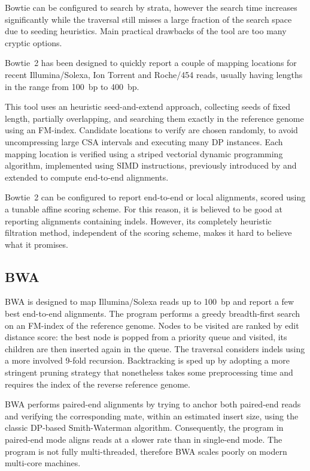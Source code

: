 Bowtie can be configured to search by strata, however the search time increases significantly while the traversal still misses a large fraction of the search space due to seeding heuristics.
Main practical drawbacks of the tool are too many cryptic options.

Bowtie~2 \citep{Langmead2012} has been designed to quickly report a couple of mapping locations for recent Illumina/Solexa, Ion Torrent and Roche/454 reads, usually having lengths in the range from 100~bp to 400~bp.

This tool uses an heuristic seed-and-extend approach, collecting seeds of fixed length, partially overlapping, and searching them exactly in the reference genome using an FM-index.
Candidate locations to verify are chosen randomly, to avoid uncompressing large CSA intervals and executing many DP instances.
Each mapping location is verified using a striped vectorial dynamic programming algorithm, implemented using SIMD instructions, previously introduced by \citep{Farrar2007} and extended to compute end-to-end alignments.

Bowtie~2 can be configured to report end-to-end or local alignments, scored using a tunable affine scoring scheme.
For this reason, it is believed to be good at reporting alignments containing indels.
However, its completely heuristic filtration method, independent of the scoring scheme, makes it hard to believe what it promises.


\subsection{BWA}

BWA \citep{Li2009} is designed to map Illumina/Solexa reads up to 100~bp and report a few best end-to-end alignments.
The program performs a greedy breadth-first search on an FM-index of the reference genome.
Nodes to be visited are ranked by edit distance score: the best node is popped from a priority queue and visited, its children are then inserted again in the queue.
The traversal considers indels using a more involved 9-fold recursion.
Backtracking is sped up by adopting a more stringent pruning strategy that nonetheless takes some preprocessing time and requires the index of the reverse reference genome.

BWA performs paired-end alignments by trying to anchor both paired-end reads and verifying the corresponding mate, within an estimated insert size, using the classic DP-based Smith-Waterman algorithm.
Consequently, the program in paired-end mode aligns reads at a slower rate than in single-end mode.
The program is not fully multi-threaded, therefore BWA scales poorly on modern multi-core machines.

